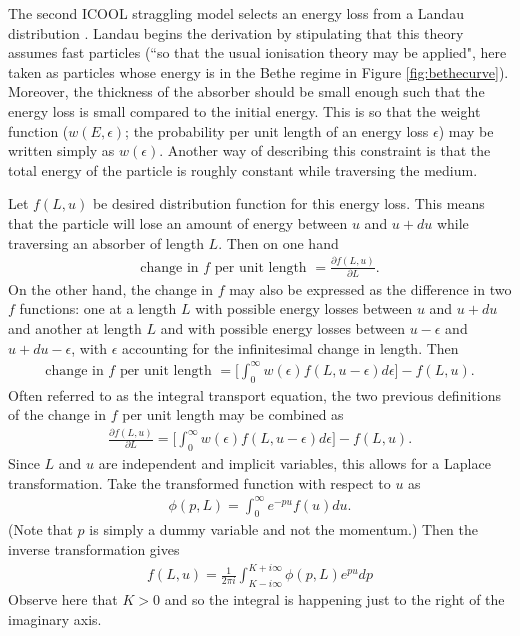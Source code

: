 The second ICOOL straggling model selects an energy loss from a Landau distribution \cite{landau}. Landau begins the derivation by stipulating that this theory assumes fast particles (``so that the usual ionisation theory may be applied", here taken as particles whose energy is in the Bethe regime in Figure \ref{fig:bethecurve}). Moreover, the thickness of the absorber should be small enough such that the energy loss is small compared to the initial energy. This is so that the weight function ($w(E,\epsilon)$; the probability per unit length of an energy loss $\epsilon$) may be written simply as $w(\epsilon)$. Another way of describing this constraint is that the total energy of the particle is roughly constant while traversing the medium.

Let $f(L,u)$ be desired distribution function for this energy loss. This means that the particle will lose an amount of energy between $u$ and $u+du$ while traversing an absorber of length $L$. Then on one hand
\begin{align*}
\text{change in $f$ per unit length }=\frac{\partial f(L,u)}{\partial L}.
\end{align*}
On the other hand, the change in $f$ may also be expressed as the difference in two $f$ functions: one at a length $L$ with possible energy losses between $u$ and $u+du$ and another at length $L$ and with possible energy losses between $u-\epsilon$ and $u+du-\epsilon$, with $\epsilon$ accounting for the infinitesimal change in length. Then
\begin{align*}
\text{change in $f$ per unit length }=\Bigg [\int_0 ^\infty w(\epsilon) f(L,u-\epsilon) d\epsilon \Bigg] - f(L,u).
\end{align*}
Often referred to as the integral transport equation, the two previous definitions of the change in $f$ per unit length may be combined as
\begin{align}\label{eqn:Landau1}
\frac{\partial f(L,u)}{\partial L} = \Bigg [\int_0 ^\infty w(\epsilon) f(L,u-\epsilon) d\epsilon \Bigg] - f(L,u).
\end{align}
Since $L$ and $u$ are independent and implicit variables, this allows for a Laplace transformation. Take the transformed function with respect to $u$ as 
\begin{align*}
\phi(p,L)=\int_0 ^\infty e^{-p u} f(u) du.
\end{align*}
(Note that $p$ is simply a dummy variable and not the momentum.)
%
Then the inverse transformation gives
\begin{align} \label{eqn:LandauInverseTransformation}
f(L,u)=\frac{1}{2\pi i} \int_{K-i \infty} ^{K+i\infty} \phi(p,L) e^{pu} dp
\end{align}
Observe here that $K>0$ and so the integral is happening just to the right of the imaginary axis.

